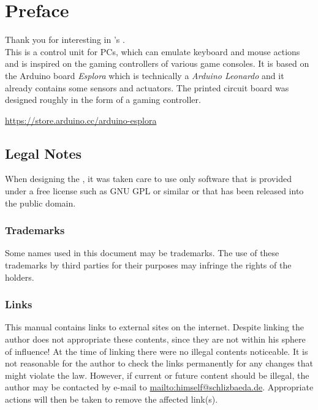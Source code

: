 \chapter{Preface}

Thank you for interesting in {\autor}'s {\Bezeichnung}.\\
This is a control unit for PCs, which can emulate keyboard and mouse
actions and is inspired on the gaming controllers of various game 
consoles. It is based on the Arduino board \textit{Esplora} which is
technically a \textit{Arduino Leonardo} and it already contains some
sensors and actuators. The printed circuit board was designed roughly in
the form of a gaming controller.

\url{https://store.arduino.cc/arduino-esplora}

\section{Legal Notes}
When designing the {\Bezeichnung}, it was taken care to use only 
software that is provided under a free license such as GNU GPL or 
similar or that has been released into the public domain.

\subsection*{Trademarks}
Some names used in this document may be trademarks. The use of these 
trademarks by third parties for their purposes may infringe the rights 
of the holders.

\subsection*{Links}
This manual contains links to external sites on the internet. Despite
linking the author {\autor} does not appropriate these contents, since
they are not within his sphere of influence! At the time of linking
there were no illegal contents noticeable. It is not reasonable for the
author to check the links permanently for any changes that might violate
the law. However, if current or future content should be illegal, the 
author may be contacted by e-mail to
\url{mailto:himself@schlizbaeda.de}.
Appropriate actions will then be taken to remove the affected link(s).

